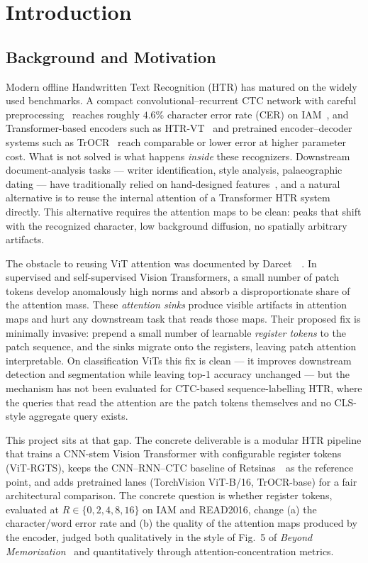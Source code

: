 \section{Introduction}
\label{sec:introduction}

\subsection{Background and Motivation}
\label{sec:background}

Modern offline Handwritten Text Recognition (HTR) has matured on the widely used benchmarks. A compact convolutional--recurrent CTC network with careful preprocessing~\cite{retsinas2022htrbestpractices} reaches roughly $4.6\%$ character error rate (CER) on IAM~\cite{marti2002iam}, and Transformer-based encoders such as HTR-VT~\cite{li2024htrvt} and pretrained encoder--decoder systems such as TrOCR~\cite{li2023trocr} reach comparable or lower error at higher parameter cost. What is not solved is what happens \emph{inside} these recognizers. Downstream document-analysis tasks --- writer identification, style analysis, palaeographic dating --- have traditionally relied on hand-designed features~\cite{souibgui2022vlac}, and a natural alternative is to reuse the internal attention of a Transformer HTR system directly. This alternative requires the attention maps to be clean: peaks that shift with the recognized character, low background diffusion, no spatially arbitrary artifacts.

The obstacle to reusing ViT attention was documented by Darcet~\etal~\cite{darcet2024registers}. In supervised and self-supervised Vision Transformers, a small number of patch tokens develop anomalously high norms and absorb a disproportionate share of the attention mass. These \emph{attention sinks} produce visible artifacts in attention maps and hurt any downstream task that reads those maps. Their proposed fix is minimally invasive: prepend a small number of learnable \emph{register tokens} to the patch sequence, and the sinks migrate onto the registers, leaving patch attention interpretable. On classification ViTs this fix is clean --- it improves downstream detection and segmentation while leaving top-1 accuracy unchanged --- but the mechanism has not been evaluated for CTC-based sequence-labelling HTR, where the queries that read the attention are the patch tokens themselves and no CLS-style aggregate query exists.

This project sits at that gap. The concrete deliverable is a modular HTR pipeline that trains a CNN-stem Vision Transformer with configurable register tokens (ViT-RGTS), keeps the CNN--RNN--CTC baseline of Retsinas~\etal\ as the reference point, and adds pretrained lanes (TorchVision ViT-B/16, TrOCR-base) for a fair architectural comparison. The concrete question is whether register tokens, evaluated at $R \in \{0, 2, 4, 8, 16\}$ on IAM and READ2016, change (a) the character/word error rate and (b) the quality of the attention maps produced by the encoder, judged both qualitatively in the style of Fig.~5 of \emph{Beyond Memorization}~\cite{nikolaidou2024beyondmem} and quantitatively through attention-concentration metrics.

